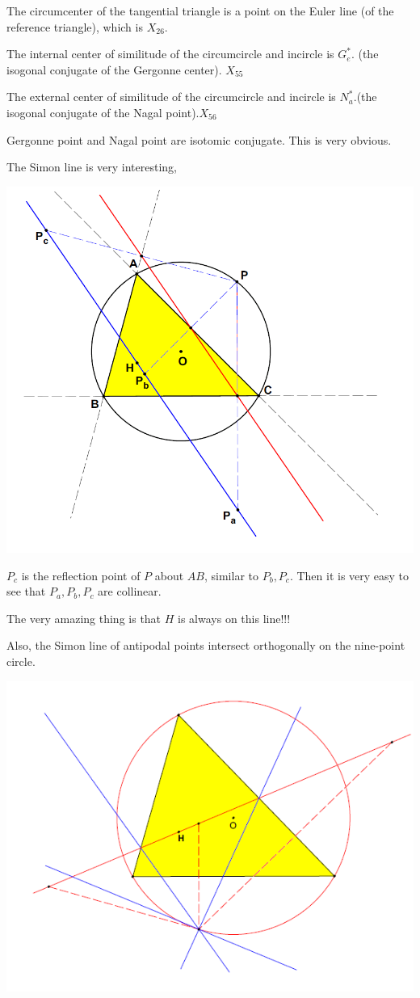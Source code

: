 The circumcenter of the tangential triangle is a point on the Euler line (of the reference triangle), which is $X_{26}$.

The internal center of similitude of the circumcircle and incircle is $G_e^{*}$. (the isogonal conjugate of the Gergonne center). $X_{55}$

The external center of similitude of the circumcircle and incircle is $N_a^{*}$.(the isogonal conjugate of the Nagal point).$X_{56}$

Gergonne point and Nagal point are isotomic conjugate. This is very obvious.

The Simon line is very interesting, 

\includegraphics{simonline.png}

$P_c$ is the reflection point of $P$ about $AB$, similar to $P_b, P_c$. Then it is very easy to see that $P_a, P_b, P_c$ are collinear.

The very amazing thing is that $H$ is always on this line!!!

Also, the Simon line of antipodal points intersect orthogonally on the nine-point circle.

\includegraphics{simonline2}

